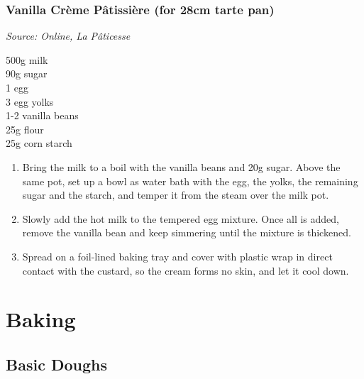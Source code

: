 \documentclass{report}
\begin{document}
\section[Vanilla Crème Pâtissière]{Vanilla Crème Pâtissière (for 28cm tarte pan)}
\textit{Source: Online, La Pâticesse}\\
\begin{minipage}[t]{0.21\textwidth} \vspace{0pt}
500g milk\\
90g sugar\\
1 egg\\
3 egg yolks\\
1-2 vanilla beans\\
25g flour\\
25g corn starch
\end{minipage}
\hfill
\begin{minipage}[t]{0.78\textwidth} \vspace{0pt}
	\begin{enumerate}
		\item Bring the milk to a boil with the vanilla beans and 20g sugar. Above the same pot, set up a bowl as water bath with the egg, the yolks, the remaining sugar and the starch, and temper it from the steam over the milk pot.
		\item Slowly add the hot milk to the tempered egg mixture. Once all is added, remove the vanilla bean and keep simmering until the mixture is thickened.
		\item Spread on a foil-lined baking tray and cover with plastic wrap in direct contact with the custard, so the cream forms no skin, and let it cool down.
	\end{enumerate}	
\end{minipage}

\part{Baking}
\chapter{Basic Doughs}
\end{document}
